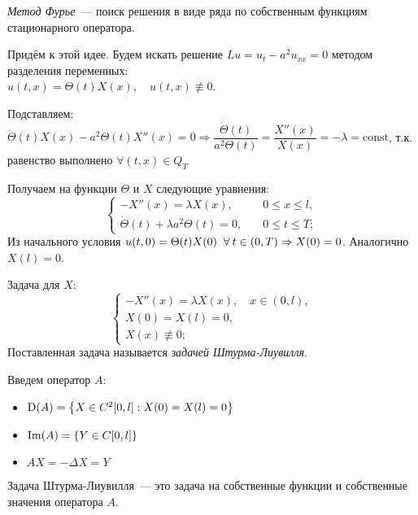 {\it Метод Фурье}~--- поиск решения в виде ряда по собственным функциям стационарного оператора.

Придём к этой идее. Будем искать решение $Lu = u_t - a^2u_{xx} = 0$ методом разделения переменных: \\ $u(t,x) = \Theta(t) X(x), \quad u(t,x) \not\equiv 0$.

Подставляем: $\dot{\Theta}(t) X(x) - a^2\Theta(t) X''(x) = 0 \Rightarrow \dfrac{\dot{\Theta}(t)}{a^2\Theta(t)} = \dfrac{X''(x)}{X(x)} = -\lambda = \text{const}$, т.к. равенство выполнено $\forall (t,x) \in Q_T$

Получаем на функции $\Theta$ и $X$ следующие уравнения:
\begin{equation*}
	\begin{cases}
		-X''(x) = \lambda X(x), \quad & 0 \leq x \leq l, \\
		\dot{\Theta}(t) + \lambda a^2 \Theta(t) = 0, \quad & 0 \leq t \leq T;
	\end{cases}
\end{equation*}
Из начального условия $u(t,0) = \Theta(t)X(0) \;\;\forall\: t \in (0,T) \Rightarrow X(0) = 0$. Аналогично $X(l) = 0$.

Задача для $X$:
\begin{equation}
	\begin{cases}
		-X''(x) = \lambda X(x), \quad x \in (0,l), \\
		X(0) = X(l) = 0, \\
		X(x) \not\equiv 0;
	\end{cases}
\end{equation}
Поставленная задача называется {\it задачей Штурма-Лиувилля}.

Введем оператор $A$:
\begin{itemize}
	\item $\mathrm{D}(A) = \left\{X \in C^2[0,l] : X(0) = X(l) = 0\right\}$
	\item $\mathrm{Im}(A) = \left\{Y \in C[0,l]\right\}$
	\item $AX = -\Delta X = Y$
\end{itemize}

Задача Штурма-Лиувилля~--- это задача на собственные функции и собственные значения оператора $A$.

